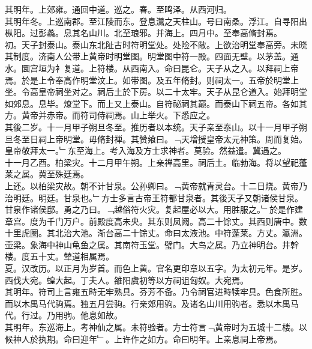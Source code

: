\documentclass{zhvt-classic}
\begin{document}
\hspace*{2em}其明年。上郊雍。通回中道。巡之。春。至鸣泽。从西河归。\\
\hspace*{2em}其明年冬。上巡南郡。至江陵而东。登息灊之天柱山。号曰南桑。浮江。自寻阳出枞阳。过彭蠡。息其名山川。北至琅邪。并海上。四月中。至奉高脩封焉。\\
\hspace*{2em}初。天子封泰山。泰山东北阯古时符明堂处。处险不敞。上欲治明堂奉高旁。未晓其制度。济南人公带上黄帝时明堂图。明堂图中符一殿。四面无壁。以茅盖。通水。圜宫垣为衤复道。上符楼。从西南入。命曰昆仑。天子从之入。以拜祠上帝焉。於是上令奉高作明堂汶上。如带图。及五年脩封。则祠太一。五帝於明堂上坐。令高皇帝祠坐对之。祠后土於下房。以二十太牢。天子从昆仑道入。始拜明堂如郊息。息毕。燎堂下。而上又上泰山。自符祕祠其巅。而泰山下祠五帝。各如其方。黄帝并赤帝。而符司侍祠焉。山上举火。下悉应之。\\
\hspace*{2em}其後二岁。十一月甲子朔旦冬至。推历者以本统。天子亲至泰山。以十一月甲子朔旦冬至日祠上帝明堂。毋脩封禅。其赞飨曰。﹁天增授皇帝太元神策。周而复始。皇帝敬拜太一。﹂东至海上。考入海及方士求神者。莫验。然益遣。冀遇之。\\
\hspace*{2em}十一月乙酉。柏梁灾。十二月甲午朔。上亲禅高里。祠后土。临勃海。将以望祀蓬莱之属。冀至殊廷焉。\\
\hspace*{2em}上还。以柏梁灾故。朝不计甘泉。公孙卿曰。﹁黄帝就青灵台。十二日烧。黄帝乃治明廷。明廷。甘泉也。﹂方士多言古帝王符都甘泉者。其後天子又朝诸侯甘泉。甘泉作诸侯邸。勇之乃曰。﹁越俗符火灾。复起屋必以大。用胜服之。﹂於是作建章宫。度为千门万户。前殿度高未央。其东则凤阙。高二十馀丈。其西则唐中。数十里虎圈。其北治大池。渐台高二十馀丈。命曰太液池。中符蓬莱。方丈。瀛洲。壶梁。象海中神山龟鱼之属。其南符玉堂。璧门。大鸟之属。乃立神明台。井幹楼。度五十丈。辇道相属焉。\\
\hspace*{2em}夏。汉改历。以正月为岁首。而色上黄。官名更印章以五字。为太初元年。是岁。西伐大宛。蝗大起。丁夫人。雒阳虞初等以方祠诅匈奴。大宛焉。\\
\hspace*{2em}其明年。符司上言雍五畤无牢熟具。芬芳不备。乃令祠官进畤犊牢具。色食所胜。而以木禺马代驹焉。独五月尝驹。行亲郊用驹。及诸名山川用驹者。悉以木禺马代。行过。乃用驹。他息如故。\\
\hspace*{2em}其明年。东巡海上。考神仙之属。未符验者。方士符言﹁黄帝时为五城十二楼。以候神人於执期。命曰迎年﹂。上许作之如方。命曰明年。上亲息祠上帝焉。\\
\end{document}
